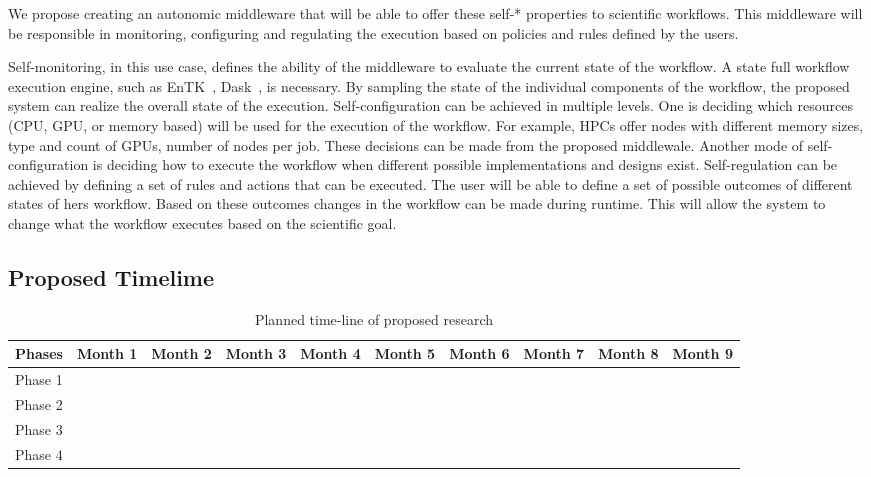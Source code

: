 We propose creating an autonomic middleware that will be able to offer these self-* properties to scientific workflows. This middleware will be responsible in monitoring, configuring and regulating the execution based on policies and rules defined by the users. 

Self-monitoring, in this use case, defines the ability of the middleware to evaluate the current state of the workflow. A state full workflow execution engine, such as EnTK~\cite{balasubramanian2018harnessing}, Dask~\cite{rocklin2015dask}, is necessary. By sampling the state of the individual components of the workflow, the proposed system can realize the overall state of the execution. Self-configuration can be achieved in multiple levels. One is deciding which resources (CPU, GPU, or memory based) will be used for the execution of the workflow. For example, HPCs offer nodes with different memory sizes, type and count of GPUs, number of nodes per job. These decisions can be made from the proposed middlewale. Another mode of self-configuration is deciding how to execute the workflow when different possible implementations and designs exist.  Self-regulation can be achieved by defining a set of rules and actions that can be executed. The user will be able to define a set of possible outcomes of different states of hers workflow. Based on these outcomes changes in the workflow can be made during runtime. This will allow the system to change what the workflow executes based on the scientific goal.

\subsection{Proposed Timelime}
\begin{table*}
	\centering
	\begin{tabular}{ |p{1.25cm}|p{1.25cm} p{1.25cm} p{1.25cm} p{1.25cm} p{1.25cm} p{1.25cm} p{1.25cm} p{1.25cm} p{1.25cm}|}
		\hline
		Phases  & Month 1 & Month 2 & Month 3 & Month 4 & Month 5 & Month 6 & Month 7 & Month 8 & Month 9 \\\hline\hline
		Phase 1 &         &         &         &         &         &         &         &         &         \\\hline
		Phase 2 &         &         &         &         &         &         &         &         &         \\\hline
		Phase 3 &         &         &         &         &         &         &         &         &         \\\hline
		Phase 4 &         &         &         &         &         &         &         &         &         \\\hline
	\end{tabular}
\caption{Planned time-line of proposed research}\label{tab:work_plan}
\end{table*}

